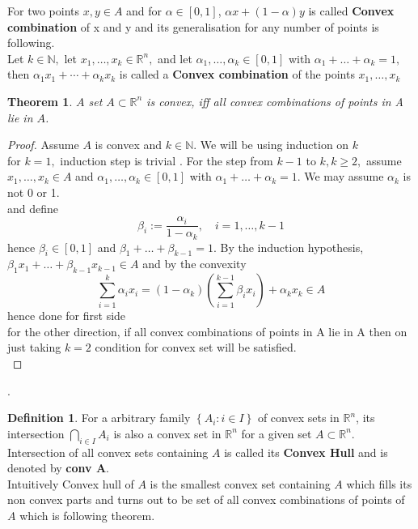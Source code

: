 \documentclass[oneside]{book}
\newtheorem{theorem}{Theorem}[section]
\theoremstyle{definition}
\newtheorem{mydef}{Definition}[chapter]
\begin{document}
 For two points $x,y \in A$ and for $\alpha \in [0,1]$, $\alpha x +(1- \alpha)y  $ is called \textbf{Convex combination} of x and y and its generalisation for any number of  points is following. \\

Let $k \in \mathbb{N},$ let $x_{1}, \ldots, x_{k} \in \mathbb{R}^{n},$ and let $\alpha_{1}, \ldots, \alpha_{k} \in[0,1]$ with $\alpha_{1}+\ldots+\alpha_{k}=1,$ then
$\alpha_{1} x_{1}+\cdots+\alpha_{k} x_{k}$ is called a \textbf{Convex combination} of the points $x_{1}, \ldots, x_{k}$

\begin{theorem}
\label{t:4}
$A$ set $A \subset \mathbb{R}^{n}$ is convex, iff  all convex combinations of points in A lie
in $A$.
\end{theorem}

\begin{proof}

 Assume $A$ is convex and $k \in \mathbb{N} .$ We will be using induction on $k$ \\ for $k=1,$ induction step is trivial  . For the step from $k-1$ to $k, k \geq 2,$ assume $x_{1}, \ldots, x_{k} \in A$ and $\alpha_{1}, \ldots, \alpha_{k} \in[0,1]$ with $\alpha_{1}+\ldots+\alpha_{k}=1 .$ We may assume $\alpha_{k}$ is not 0 or 1.\\ and define 
$$
\beta_{i}:=\frac{\alpha_{i}}{1-\alpha_{k}}, \quad i=1, \ldots, k-1
$$
hence $\beta_{i} \in[0,1]$ and $\beta_{1}+\ldots+\beta_{k-1}=1 .$ By the induction hypothesis, $\beta_{1} x_{1}+\ldots+\beta_{k-1} x_{k-1} \in A$
and by the convexity
$$
\sum_{i=1}^{k} \alpha_{i} x_{i}=\left(1-\alpha_{k}\right)\left(\sum_{i=1}^{k-1} \beta_{i} x_{i}\right)+\alpha_{k} x_{k} \in A
$$
hence done for first side\\
for the other direction, if all convex combinations of points in A lie in A then on just taking $k =2$ condition for convex set will be satisfied.\\

\end{proof}.

\begin{mydef} 


For a arbitrary family  $\left\{A_{i}: i \in I\right\}$ of convex sets in   $\mathbb{R}^{n}$, its intersection $\bigcap_{i \in I} A_{i}$ is also a convex set in $\mathbb{R}^{n}$  for a given set $A \subset \mathbb{R}^{n}$.\\ Intersection of all convex sets containing $A$ is called its  \textbf{Convex Hull} and is denoted by  \textbf{conv A}.\\
 Intuitively Convex hull of $A$  is the smallest convex set containing $A$ which fills its non convex parts and turns out to be set of all convex combinations of points of $A$ which is following theorem.
 
 \end{mydef}
 
\end{document}
